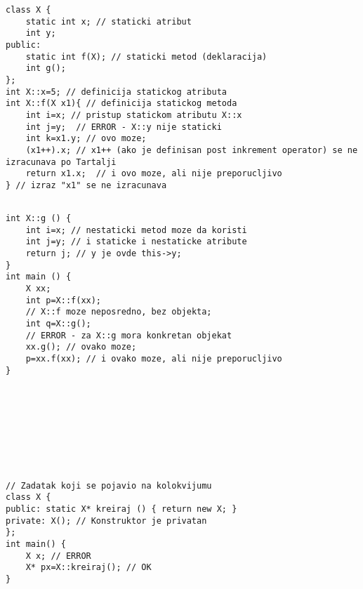 \documentclass{article}
\newenvironment{xitemize}{%
    
    \itemize
    \larger
}{%
    \enditemize
}
\let\olditemize\itemize
\let\endolditemize\enditemize
\renewenvironment{itemize}{%
    \smaller
    \olditemize
}{%
    \endolditemize
}
\begin{document}
\begin{xitemize}
\begin{itemize}
\begin{center}
\begin{adjustwidth}{-4cm}{-2.5cm}
    \begin{multicols}{2}
    \begin{lstlisting}
class X {
    static int x; // staticki atribut
    int y;
public:
    static int f(X); // staticki metod (deklaracija)
    int g();
};
int X::x=5; // definicija statickog atributa
int X::f(X x1){ // definicija statickog metoda
    int i=x; // pristup statickom atributu X::x
    int j=y;  // ERROR - X::y nije staticki
    int k=x1.y; // ovo moze;
    (x1++).x; // x1++ (ako je definisan post inkrement operator) se ne izracunava po Tartalji 
    return x1.x;  // i ovo moze, ali nije preporucljivo
} // izraz "x1" se ne izracunava 
    \end{lstlisting}
    \columnbreak
    \begin{lstlisting}

int X::g () {
    int i=x; // nestaticki metod moze da koristi
    int j=y; // i staticke i nestaticke atribute
    return j; // y je ovde this->y;
}
int main () {
    X xx;
    int p=X::f(xx); 
    // X::f moze neposredno, bez objekta;
    int q=X::g(); 
    // ERROR - za X::g mora konkretan objekat
    xx.g(); // ovako moze;
    p=xx.f(xx); // i ovako moze, ali nije preporucljivo
}

 
  
   
    
     
     
     
    \end{lstlisting}
    \end{multicols}
\end{adjustwidth}
\end{center}
 \newpage
    \begin{lstlisting}
// Zadatak koji se pojavio na kolokvijumu
class X {
public: static X* kreiraj () { return new X; }
private: X(); // Konstruktor je privatan
};
int main() {
    X x; // ERROR
    X* px=X::kreiraj(); // OK
}
 \end{lstlisting}


\end{itemize}
\end{xitemize}
\end{document}
